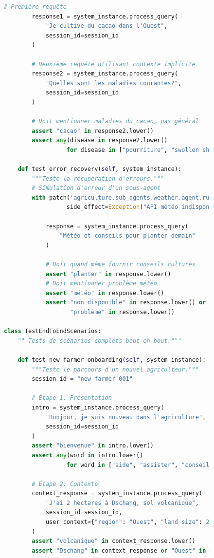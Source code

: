 \begin{figure}[H]
\begin{lstlisting}[language=Python, caption=Suite de tests d'intégration]
        # Première requête
        response1 = system_instance.process_query(
            "Je cultive du cacao dans l'Ouest",
            session_id=session_id
        )

        # Deuxième requête utilisant contexte implicite
        response2 = system_instance.process_query(
            "Quelles sont les maladies courantes?",
            session_id=session_id
        )

        # Doit mentionner maladies du cacao, pas général
        assert "cacao" in response2.lower()
        assert any(disease in response2.lower()
                  for disease in ["pourriture", "swollen shoot"])

    def test_error_recovery(self, system_instance):
        """Teste la récupération d'erreurs."""
        # Simulation d'erreur d'un sous-agent
        with patch('agriculture.sub_agents.weather.agent.run',
                  side_effect=Exception("API météo indisponible")):

            response = system_instance.process_query(
                "Météo et conseils pour planter demain"
            )

            # Doit quand même fournir conseils cultures
            assert "planter" in response.lower()
            # Doit mentionner problème météo
            assert "météo" in response.lower()
            assert "non disponible" in response.lower() or \
                   "problème" in response.lower()

class TestEndToEndScenarios:
    """Tests de scénarios complets bout-en-bout."""

    def test_new_farmer_onboarding(self, system_instance):
        """Teste le parcours d'un nouvel agriculteur."""
        session_id = "new_farmer_001"

        # Étape 1: Présentation
        intro = system_instance.process_query(
            "Bonjour, je suis nouveau dans l'agriculture",
            session_id=session_id
        )
        assert "bienvenue" in intro.lower()
        assert any(word in intro.lower()
                  for word in ["aide", "assister", "conseiller"])

        # Étape 2: Contexte
        context_response = system_instance.process_query(
            "J'ai 2 hectares à Dschang, sol volcanique",
            session_id=session_id,
            user_context={"region": "Ouest", "land_size": 2}
        )
        assert "volcanique" in context_response.lower()
        assert "Dschang" in context_response or "Ouest" in context_response


\end{lstlisting}
\end{figure}
